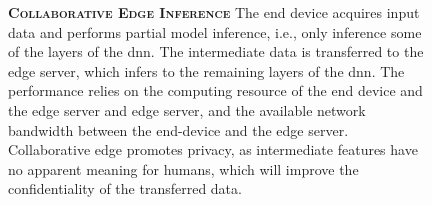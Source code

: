 \begin{figure}
	\begin{minipage}{0.65\linewidth}
		\textbf{\protect{} \textsc{Collaborative Edge Inference}}
		\color{caption-color} \newline
		The end device acquires input data and performs partial model inference, i.e., only inference some of the layers of the \gls{dnn}. The intermediate data is transferred to the edge server, which infers to the remaining layers of the \gls{dnn}. The performance relies on the computing resource of the end device and the edge server and edge server, and the available network bandwidth between the end-device and the edge server. Collaborative edge promotes privacy, as intermediate features have no apparent meaning for humans, which will improve the confidentiality of the transferred data.   
	\end{minipage}%
	\hfill
	\begin{minipage}{0.3\linewidth}
		\centering
		\captionsetup[subfigure]{justification=centering}
		\begin{figure}
			\centering

\end{figure}
\end{minipage}
\end{figure}
